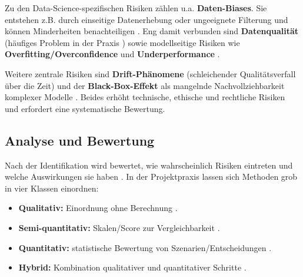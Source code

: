 Zu den Data-Science-spezifischen Risiken zählen u.a. \textbf{Daten-Biases}.
Sie entstehen z.B. durch einseitige Datenerhebung oder ungeeignete Filterung und können Minderheiten benachteiligen \citep{mehrabi_survey_2022,banks_how_2025}.
Eng damit verbunden sind \textbf{Datenqualität} (häufiges Problem in der Praxis \cite{holtkemper_risk_2023}) sowie modellseitige Risiken wie
\textbf{Overfitting/Overconfidence} und \textbf{Underperformance} \citep{aliferis_overfitting_2024,zlobin_data-driven_2025}.

Weitere zentrale Risiken sind \textbf{Drift-Phänomene} (schleichender Qualitätsverfall über die Zeit) \citep{pelosi_explainability_2025,bayram_concept_2022}
und der \textbf{Black-Box-Effekt} als mangelnde Nachvollziehbarkeit komplexer Modelle \citep{rai_explainable_2020}.
Beides erhöht technische, ethische und rechtliche Risiken und erfordert eine systematische Bewertung.

\subsection{Analyse und Bewertung}
Nach der Identifikation wird bewertet, wie wahrscheinlich Risiken eintreten und welche Auswirkungen sie haben \citep{walder_risikomanagement_2017}.
In der Projektpraxis lassen sich Methoden grob in vier Klassen einordnen:
\begin{itemize}
    \item \textbf{Qualitativ:} Einordnung ohne Berechnung \citep{macpherson_pdf_2018}.
    \item \textbf{Semi-quantitativ:} Skalen/Score zur Vergleichbarkeit \citep{aven_semi-quantitative_2008}.
    \item \textbf{Quantitativ:} statistische Bewertung von Szenarien/Entscheidungen \citep{macpherson_pdf_2018}.
    \item \textbf{Hybrid:} Kombination qualitativer und quantitativer Schritte \citep{luna_pdf_2025}.
\end{itemize}

